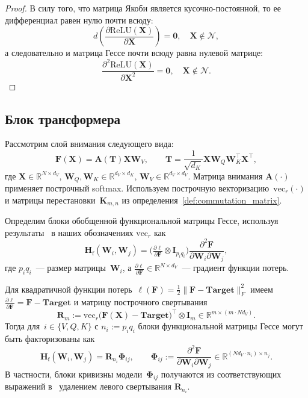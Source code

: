 \begin{proof}
В силу того, что матрица Якоби является кусочно-постоянной, то ее дифференциал равен нулю почти всюду:
\[
    d\left(\frac{\partial \mathrm{ReLU}(\mathbf{X})}{\partial \mathbf{X}}\right) = \mathbf{0}, \quad \mathbf{X} \notin \mathcal{N},
\]
а следовательно и матрица Гессе почти всюду равна нулевой матрице:
\[
    \frac{\partial^2 \mathrm{ReLU}(\mathbf{X})}{\partial \mathbf{X}^2} = \mathbf{0}, \quad \mathbf{X} \notin \mathcal{N}.
\]
\end{proof}

\subsection{Блок трансформера}

\begin{lemma}\label{lemma:attention_phi_from_functional_hessian}
Рассмотрим слой внимания следующего вида:
\[
    \mathbf{F}(\mathbf{X}) = \mathbf{A}(\mathbf{T})  \mathbf{X}\mathbf{W}_V,
    \qquad
    \mathbf{T} = \frac{1}{\sqrt{d_K}} \mathbf{X}\mathbf{W}_Q \mathbf{W}_K^\top \mathbf{X}^\top,
\]
где $\mathbf{X} \in \mathbb{R}^{N \times d_V}$, $\mathbf{W}_Q,\mathbf{W}_K \in \mathbb{R}^{d_V \times d_K}$, $\mathbf{W}_V \in \mathbb{R}^{d_V \times d_V}$.
Матрица внимания $\mathbf{A}(\cdot)$ применяет построчный softmax.
Используем построчную векторизацию~$\mathrm{vec}_r(\cdot)$ и матрицы перестановки~$\mathbf{K}_{m,n}$ из определения~\ref{def:commutation_matrix}.

Определим блоки обобщенной функциональной матрицы Гессе, используя результаты~\cite{ormaniec2024attentionhessian} в наших обозначениях $\mathrm{vec}_r$ как
\[
    \mathbf{H}_{\mathrm{f}}(\mathbf{W}_i,\mathbf{W}_j)
    = \big( \tfrac{\partial \ell}{\partial \mathbf{F}} \otimes \mathbf{I}_{p_i q_i} \big)  \frac{\partial^2 \mathbf{F}}{\partial \mathbf{W}_i \partial \mathbf{W}_j},
\]
где $p_i q_i$~--- размер матрицы~$\mathbf{W}_i$, а $\tfrac{\partial \ell}{\partial \mathbf{F}} \in \mathbb{R}^{N \times d_V}$~--- градиент функции потерь.

Для квадратичной функции потерь~$\ell(\mathbf{F})=\tfrac{1}{2}\|\mathbf{F}-\mathbf{Target}\|_F^2$ имеем~$\tfrac{\partial \ell}{\partial \mathbf{F}}=\mathbf{F}-\mathbf{Target}$ и матрицу построчного свертывания
\[
    \mathbf{R}_m := \mathrm{vec}_r\big(\mathbf{F}(\mathbf{X}) - \mathbf{Target}\big)^\top \otimes \mathbf{I}_m \in \mathbb{R}^{m \times (m \cdot N d_V)}.
\]
Тогда для~$i \in \{V,Q,K\}$ с $n_i:=p_i q_i$ блоки функциональной матрицы Гессе могут быть факторизованы как
\[
    \mathbf{H}_{\mathrm{f}}(\mathbf{W}_i,\mathbf{W}_j) = \mathbf{R}_{n_i} \boldsymbol{\Phi}_{ij},
    \qquad
    \boldsymbol{\Phi}_{ij} := \frac{\partial^2 \mathbf{F}}{\partial \mathbf{W}_i \partial \mathbf{W}_j}
    \in \mathbb{R}^{(N d_V \cdot n_i) \times n_j}.
\]
В частности, блоки кривизны модели~$\boldsymbol{\Phi}_{ij}$ получаются из соответствующих выражений в~\cite[Теорема.~3.2]{ormaniec2024attentionhessian} удалением левого свертывания $\mathbf{R}_{n_i}$.


\end{lemma}
